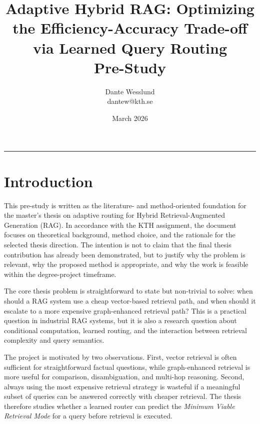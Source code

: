 \documentclass[11pt, a4paper]{article}
\begin{document}
\title{
    \textbf{Adaptive Hybrid RAG: Optimizing the Efficiency-Accuracy Trade-off via Learned Query Routing} \\
    \vspace{0.5em}
    \large Pre-Study
}

\author{
    Dante Wesslund \\
    dantew@kth.se
}

\date{March 2026}

\maketitle
\hrule
\vspace{1cm}


\section{Introduction}

This pre-study is written as the literature- and method-oriented foundation for the master's thesis on adaptive routing for Hybrid Retrieval-Augmented Generation (RAG). In accordance with the KTH assignment, the document focuses on theoretical background, method choice, and the rationale for the selected thesis direction. The intention is not to claim that the final thesis contribution has already been demonstrated, but to justify why the problem is relevant, why the proposed method is appropriate, and why the work is feasible within the degree-project timeframe.

The core thesis problem is straightforward to state but non-trivial to solve: when should a RAG system use a cheap vector-based retrieval path, and when should it escalate to a more expensive graph-enhanced retrieval path? This is a practical question in industrial RAG systems, but it is also a research question about conditional computation, learned routing, and the interaction between retrieval complexity and query semantics.

The project is motivated by two observations. First, vector retrieval is often sufficient for straightforward factual questions, while graph-enhanced retrieval is more useful for comparison, disambiguation, and multi-hop reasoning. Second, always using the most expensive retrieval strategy is wasteful if a meaningful subset of queries can be answered correctly with cheaper retrieval. The thesis therefore studies whether a learned router can predict the \emph{Minimum Viable Retrieval Mode} for a query before retrieval is executed.
\end{document}
